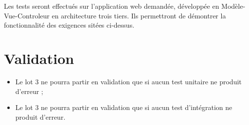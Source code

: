 	Les tests seront effectués sur l'application web demandée, développée en Modèle-Vue-Controleur en architecture trois tiers. Ils permettront de démontrer la fonctionnalité des exigences sitées ci-dessus.

\section{Validation}	
	\begin{itemize}
		\item Le lot 3 ne pourra partir en validation que si aucun test unitaire ne produit d'erreur ;
		\item Le lot 3 ne pourra partir en validation que si aucun test d’intégration ne produit d'erreur.
	\end{itemize}
	

